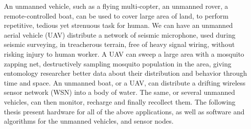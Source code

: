 

An unmanned vehicle, such as a flying multi-copter, an unmanned rover, a remote-controlled boat, can be used to cover large area of land, to perform repetitive, tedious yet strenuous task for human.
We can have an unmanned aerial vehicle (UAV) distribute a network of seismic microphone, used during seismic surveying, in treacherous terrain, free of heavy signal wiring, without risking injury to human worker.
A UAV can sweep a large area with a mosquito zapping net, destructively sampling mosquito population in the area, giving entomology researcher better data about their distribution and behavior through time and space.
An unmanned boat, or a UAV, can distribute a drifting wireless sensor network (WSN) into a body of water.
The same, or several unmanned vehicles, can then monitor, recharge and finally recollect them.
The following thesis present hardware for all of the above applications, as well as software and algorithms for the unmanned vehicles, and sensor nodes.
